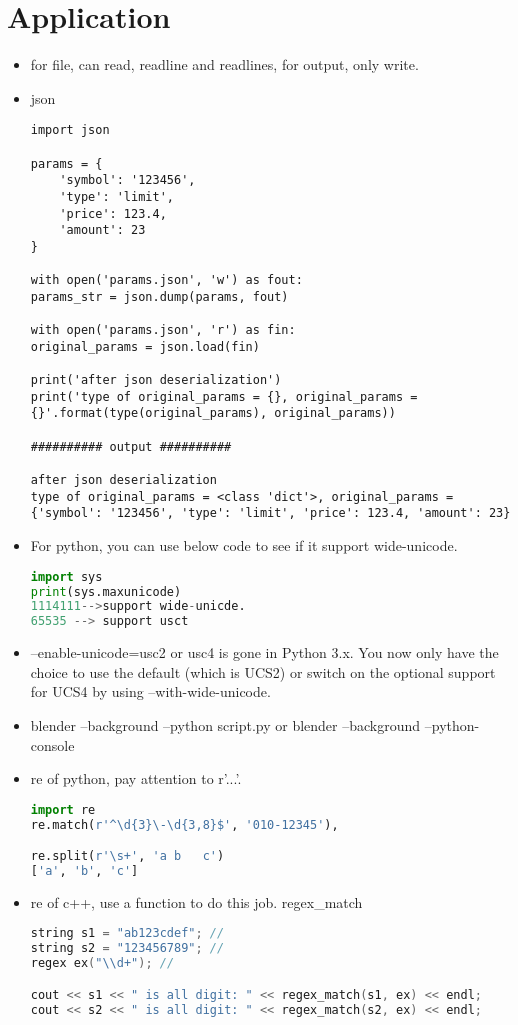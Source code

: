 \documentclass[a4paper,12pt,twoside]{book}
\begin{document}
\section{Application}
\begin{itemize}
	\item for file, can read, readline and readlines, for output, only write.
	
	\item json
\begin{lstlisting}
import json

params = {
	'symbol': '123456',
	'type': 'limit',
	'price': 123.4,
	'amount': 23
}

with open('params.json', 'w') as fout:
params_str = json.dump(params, fout)

with open('params.json', 'r') as fin:
original_params = json.load(fin)

print('after json deserialization')
print('type of original_params = {}, original_params = {}'.format(type(original_params), original_params))

########## output ##########

after json deserialization
type of original_params = <class 'dict'>, original_params = {'symbol': '123456', 'type': 'limit', 'price': 123.4, 'amount': 23}	
\end{lstlisting}
	
	\item For python, you can use below code to see if it support wide-unicode.
\begin{lstlisting}[frame=single, language=python]
import sys
print(sys.maxunicode) 
1114111-->support wide-unicde.
65535 --> support usct	
\end{lstlisting} 	
	
	\item --enable-unicode=usc2 or usc4 is gone in Python 3.x. You now only have the choice to use the default (which is UCS2) or switch on the optional support for UCS4 by using --with-wide-unicode.
	
	\item blender --background --python script.py or blender --background --python-console
	
	\item re of python, pay attention to r'...'.
\begin{lstlisting}[frame=single, language=python, mathescape=false]
import re
re.match(r'^\d{3}\-\d{3,8}$', '010-12345'), 

re.split(r'\s+', 'a b   c')
['a', 'b', 'c']
\end{lstlisting} 

	\item re of c++, use a function to do this job. regex\_match
\begin{lstlisting}[frame=single, language=c++]
string s1 = "ab123cdef"; //
string s2 = "123456789"; //
regex ex("\\d+"); //

cout << s1 << " is all digit: " << regex_match(s1, ex) << endl; 
cout << s2 << " is all digit: " << regex_match(s2, ex) << endl; 
\end{lstlisting} 

	
\end{itemize}
\end{document}
